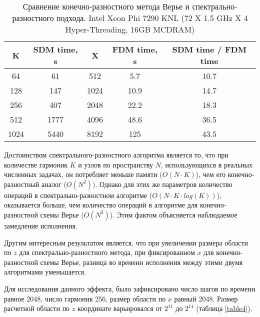 \begin{center}
\begin{table}[h!]
\centering
  \begin{tabular}{|c|c|c|c|c|}
   \hline
	\textbf{K} &  \textbf{SDM time, s} & \textbf{X} & \textbf{FDM time, s} & \textbf{SDM time / FDM time} \\
	\hline
	64 &  61 & 512 & 5.7 & 10.7 \\
	\hline
	128 &  147 & 1024 & 10.9 & 14.7 \\
	\hline
	256 &  407 & 2048 & 22.2 & 18.3 \\
	\hline
	512 &  1777 & 4096 & 48.6 & 36.5 \\
	\hline
	1024 &  5440 & 8192 & 125 & 43.5 \\
  \hline 
  \end{tabular}
  \captionsetup{justification=centering}
  \caption{Сравнение конечно-разностного метода Верье и спектрально-разностного подхода. Intel Xeon Phi 7290 KNL (72 X 1.5 GHz X 4 Hyper-Threading, 16GB MCDRAM)}\label{table}
\end{table}
\end{center}

Достоинством спектрального-разностного алгоритма является то, что при количестве гармоник $K$ и узлов по пространству $N$,
использующихся в реальных численных задачах, он потребляет меньше памяти ($O(N\cdot K)$), чем его конечно-разностный аналог ($O(N^2)$).
Однако для этих же параметров количество операций в спектрально-разностном алгоритме ($O(N\cdot K\cdot log(K))$),
оказывается больше, чем количество операций в алгоритме для конечно-разностной схемы Верье ($O(N^2)$).
Этим фактом объясняется наблюдаемое замедление исполнения. 

Другим интересным результатом является, что при увеличении размера области по $z$ для спектрально-разностного метода, при фиксированном $x$ для конечно-разностной схемы Верье, разница во времени исполнения между этими двумя алгоритмами уменьшается.

Для исследования данного эффекта, было зафиксировано число шагов по времени равное 2048, число гармоник 256, размер области по $x$ равный 2048.
Размер расчетной области по $z$ координате варьировался от $2^{11}$ до $2^{14}$ (таблица \ref{table4}).

